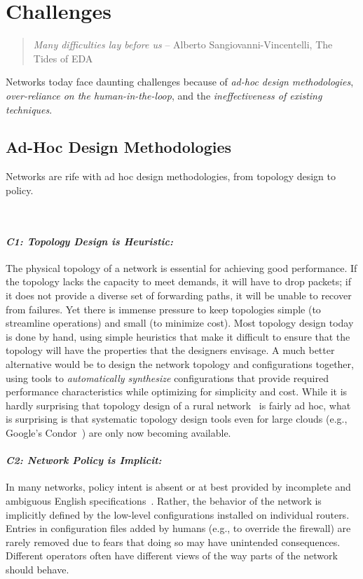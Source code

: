 \section{Challenges}
\label{sec:challenges}

\begin{quote}
{\em Many difficulties lay before us} -- Alberto
Sangiovanni-Vincentelli, The Tides of EDA~\cite{alberto}
\vspace{-2mm}
\end{quote}

Networks today face daunting challenges because of {\em ad-hoc design methodologies}, {\em over-reliance on the human-in-the-loop}, and the {\em ineffectiveness of existing techniques}.

\subsection{Ad-Hoc Design Methodologies}

Networks are rife with ad hoc design methodologies, from topology design to policy.

\
\paragraph*{\em C1: Topology Design is Heuristic:}
%
The physical topology of a network is essential for achieving good performance. If the topology lacks the capacity to meet demands, it will have to drop packets; if it does not provide a diverse set of forwarding paths, it will be unable to recover from failures.  Yet there is immense pressure to keep topologies simple (to streamline operations) and small (to minimize cost). Most topology design today is done by hand, using simple heuristics that make it difficult to ensure that the topology will have the properties that the designers envisage. A much better alternative would be to design the network topology and configurations together, using tools to {\em automatically synthesize} configurations that provide required performance characteristics while optimizing for simplicity and cost. While it is
hardly surprising that topology design of a rural network~\cite{barathwisp} is fairly ad hoc, what is surprising is that systematic topology design tools even for large clouds (e.g.,  Google's Condor~\cite{condor}) are only now becoming available.

\paragraph*{\em C2: Network Policy is Implicit:}
%
In many networks, policy intent is absent or at best provided by incomplete and ambiguous English specifications~\cite{propane}. Rather, the behavior of the network is implicitly defined by the low-level configurations installed on individual routers. Entries in configuration files added by humans (e.g., to override the firewall) are rarely removed due to fears that doing so may have unintended consequences. Different operators often have different views of the way parts of the network should behave.

